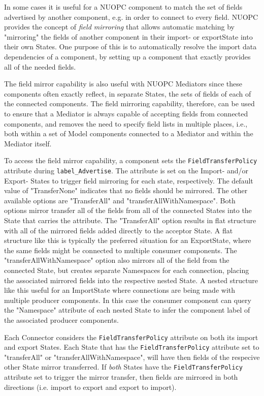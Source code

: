 %

\label{FieldMirror}

In some cases it is useful for a NUOPC component to match the set of fields advertised by another component, e.g. in order to connect to every field. NUOPC provides the concept of {\em field mirroring} that allows automatic matching by "mirroring" the fields of another component in their import- or exportState into their own States. One purpose of this is to automatically resolve the import data dependencies of a component, by setting up a component that exactly provides all of the needed fields.

The field mirror capability is also useful with NUOPC Mediators since these components often exactly reflect, in separate States, the sets of fields of each of the connected components.  The field mirroring capability, therefore, can be used to ensure that a Mediator is always capable of accepting fields from connected components, and removes the need to specify field lists in multiple places, i.e., both within a set of Model components connected to a Mediator and within the Mediator itself.

To access the field mirror capability, a component sets the {\tt FieldTransferPolicy} attribute during {\tt label\_Advertise}. The attribute is set on the Import- and/or Export- States to trigger field mirroring for each state, respectively.  The default value of "TransferNone" indicates that no fields should be mirrored.  The other available options are "TransferAll" and "transferAllWithNamespace". Both options mirror transfer all of the fields from all of the connected States into the State that carries the attribute. The "TransferAll" option results in flat structure with all of the mirrored fields added directly to the acceptor State. A flat structure like this is typically the preferred situation for an ExportState, where the same fields might be connected to multiple consumer components. The "transferAllWithNamespace" option also mirrors all of the field from the connected State, but creates separate Namespaces for each connection, placing the associated mirrored fields into the respective nested State. A nested structure like this useful for an ImportState where connections are being made with multiple producer components. In this case the consumer component can query the "Namespace" attribute of each nested State to infer the component label of the associated producer components.

Each Connector considers the {\tt FieldTransferPolicy} attribute on both its import and export States.  Each State that has the {\tt FieldTransferPolicy} attribute set to "transferAll" or "transferAllWithNamespace", will have then fields of the respecive other State mirror transferred. If {\em both} States have the {\tt FieldTransferPolicy} attribute set to trigger the mirror transfer, then fields are mirrored in both directions (i.e. import to export and export to import).

